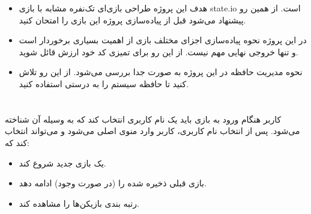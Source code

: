 \documentclass[]{article}
\begin{document}
\begin{itemize}
	\item 
	هدف این پروژه طراحی بازی‌ای تک‌نفره مشابه با بازی state.io است. از همین رو پیشنهاد می‌شود قبل از پیاده‌سازی پروژه این بازی را امتحان کنید.
	
	\item
	در این پروژه نحوه‌ پیاده‌سازی اجزای مختلف بازی از اهمیت بسیاری برخوردار است و تنها خروجی نهایی مهم نیست. از این رو برای تمیزی کد خود ارزش قائل شوید.
	
	
	\item
	نحوه مدیریت حافظه در این پروژه به صورت جدا بررسی می‌شود. از این رو تلاش کنید تا حافظه سیستم را به درستی استفاده کنید.
	
\end{itemize}





\section*{{}}
کاربر هنگام ورود به بازی باید یک نام کاربری انتخاب کند که به وسیله آن شناخته می‌شود.
\newline
پس از انتخاب نام کاربری، کاربر وارد منوی اصلی می‌شود و می‌تواند انتخاب کند که:
\begin{itemize}
    \item{
    یک بازی جدید شروع کند.
    } 
    \item{
    بازی قبلی ذخیره شده را (در صورت وجود) ادامه دهد.
    }
    \item{
    رتبه بندی بازیکن‌ها را مشاهده کند.
    }
\end{itemize}
\end{document}
